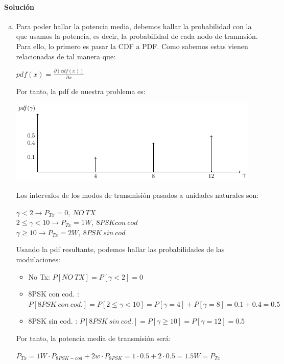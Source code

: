 \documentclass[fleqn,14pt]{article}
\begin{document}
\paragraph{Soluci\'on}
\begin{enumerate}[a)]
  \item Para poder hallar la potencia media, debemos hallar la probabilidad con la que usamos la potencia, es decir, la probabilidad de cada nodo de tranmsión. Para ello, lo primero es pasar la CDF a PDF. Como sabemos estas vienen relacionadas de tal manera que:

  \begin{center}
    $pdf(x) = \frac{\partial(cdf(x))}{\partial x}$
  \end{center}

  Por tanto, la pdf de nuestra problema es:

  \centering
  \includegraphics{images/pdfCuestion2_17_18.png}

  \raggedright
  Los intervalos de los modos de transmisión pasados a unidades naturales son:
  \begin{center}
    $\gamma < 2 \rightarrow P_{Tx} = 0 , \  NO \ TX$ \\
    $2 \leq \gamma < 10 \rightarrow P_{Tx} = 1 W, \ 8PSK con\ cod$\\
    $\gamma \geq 10 \rightarrow P_{Tx} = 2 W,\ 8PSK\ sin \ cod$
  \end{center}

  Usando la pdf resultante, podemos hallar las probabilidades de las modulaciones:
  \begin{itemize}
    \item No Tx: $P[NO \ TX] = P[\gamma < 2] = 0$
    \item 8PSK con cod. : $P[8PSK\ con \ cod.] = P[2 \leq \gamma < 10] = P[\gamma = 4] + P[\gamma = 8] = 0.1 + 0.4 = 0.5$
    \item 8PSK sin cod. : $P[8PSK\ sin \ cod.] = P[\gamma \geq 10] = P[\gamma = 12] = 0.5$
  \end{itemize}

  Por tanto, la potencia media de transmisión será:\\
  \begin{center}
    $\overline{P_{Tx}} = 1 W \cdot P_{8PSK-cod} + 2 w \cdot P_{8PSK} = 1 \cdot 0.5 + 2 \cdot 0.5 = \boxed{1.5 W = \overline{P_{Tx}}}$
  \end{center}


\end{enumerate}
\end{document}
